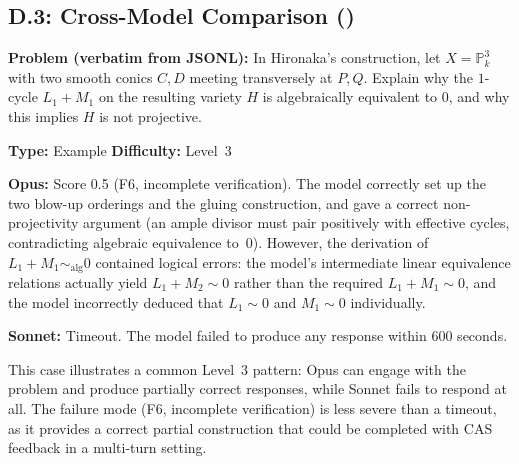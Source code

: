 \subsection*{D.3: Cross-Model Comparison ()}

\textbf{Problem (verbatim from JSONL):} In Hironaka's construction, let $X = \mathbb{P}_k^3$ with two smooth conics $C, D$ meeting transversely at $P, Q$. Explain why the $1$-cycle $L_1 + M_1$ on the resulting variety $H$ is algebraically equivalent to $0$, and why this implies $H$ is not projective.

\textbf{Type:} Example \quad \textbf{Difficulty:} Level~3

\textbf{Opus:} Score 0.5 (F6, incomplete verification). The model correctly set up the two blow-up orderings and the gluing construction, and gave a correct non-projectivity argument (an ample divisor must pair positively with effective cycles, contradicting algebraic equivalence to~$0$). However, the derivation of $L_1 + M_1 \sim_{\mathrm{alg}} 0$ contained logical errors: the model's intermediate linear equivalence relations actually yield $L_1 + M_2 \sim 0$ rather than the required $L_1 + M_1 \sim 0$, and the model incorrectly deduced that $L_1 \sim 0$ and $M_1 \sim 0$ individually.

\textbf{Sonnet:} Timeout. The model failed to produce any response within 600 seconds.

This case illustrates a common Level~3 pattern: Opus can engage with the problem and produce partially correct responses, while Sonnet fails to respond at all.
The failure mode (F6, incomplete verification) is less severe than a timeout, as it provides a correct partial construction that could be completed with CAS feedback in a multi-turn setting.
